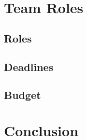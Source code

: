 \documentclass[letterpaper,12pt]{report}
\begin{document}
\subsection{} %
\subsection{}
\subsection{}

\section{Team Roles}
\subsection{Roles}
\subsection{Deadlines}
\subsection{Budget}

\section{Conclusion}
\end{document}
